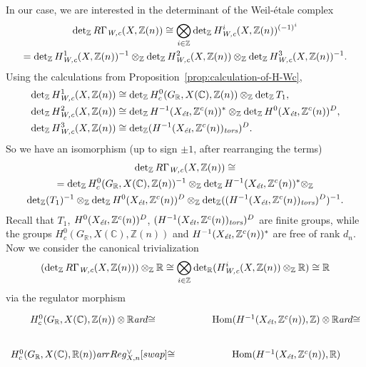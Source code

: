 \documentclass{article}
\DeclareMathOperator{\Hom}{Hom}
\newcommand{\CC}{\mathbb{C}}
\newcommand{\RR}{\mathbb{R}}
\newcommand{\ZZ}{\mathbb{Z}}
\renewcommand{\det}{\operatorname{det}}
\newcommand{\ar}{\text{\it ar}}
\newcommand{\et}{\text{\it \'{e}t}}
\newcommand{\tors}{\text{\it tors}}
\newcommand{\Wc}{\text{\it W,c}}
\theoremstyle{myplain}
\theoremstyle{mydefinition}
\begin{document}
In our case, we are interested in the determinant of the Weil-\'{e}tale complex
\begin{multline*}
  \det_\ZZ R\Gamma_\Wc (X, \ZZ(n)) \cong
  \bigotimes_{i \in \ZZ} \det_\ZZ H^i_\Wc (X, \ZZ(n))^{(-1)^i} \\
  =
  \det_\ZZ H^1_\Wc (X, \ZZ(n))^{-1} \otimes_\ZZ
  \det_\ZZ H^2_\Wc (X, \ZZ(n)) \otimes_\ZZ
  \det_\ZZ H^3_\Wc (X, \ZZ(n))^{-1}.
\end{multline*}
Using the calculations from Proposition~\ref{prop:calculation-of-H-Wc},
\begin{align*}
  \det_\ZZ H^1_\Wc (X, \ZZ(n)) & \cong \det_\ZZ H^0_c (G_\RR, X(\CC), \ZZ(n)) \otimes_\ZZ \det_\ZZ T_1, \\
  \det_\ZZ H^2_\Wc (X, \ZZ(n)) & \cong \det_\ZZ H^{-1} (X_\et, \ZZ^c(n))^* \otimes_\ZZ \det_\ZZ H^0 (X_\et, \ZZ^c(n))^D, \\
  \det_\ZZ H^3_\Wc (X, \ZZ(n)) & \cong \det_\ZZ (H^{-1} (X_\et, \ZZ^c(n))_\tors)^D.
\end{align*}
So we have an isomorphism (up to sign $\pm 1$, after rearranging the terms)
\begin{multline*}
  \det_\ZZ R\Gamma_\Wc (X, \ZZ(n)) \cong \\
  =
  \det_\ZZ H^0_c (G_\RR, X(\CC), \ZZ(n))^{-1} \otimes_\ZZ
  \det_\ZZ H^{-1} (X_\et, \ZZ^c(n))^* \otimes_\ZZ \\
  \det_\ZZ (T_1)^{-1} \otimes_\ZZ  \det_\ZZ H^0 (X_\et, \ZZ^c(n))^D \otimes_\ZZ \det_\ZZ ((H^{-1} (X_\et, \ZZ^c(n))_\tors)^D)^{-1}.
\end{multline*}
Recall that $T_1$, $H^0 (X_\et, \ZZ^c(n))^D$,
$(H^{-1} (X_\et, \ZZ^c(n))_\tors)^D$ are finite groups, while the groups
$H^0_c (G_\RR, X(\CC), \ZZ(n))$ and $H^{-1} (X_\et, \ZZ^c(n))^*$ are free of
rank $d_n$. Now we consider the canonical trivialization
\[ (\det_\ZZ R\Gamma_\Wc (X, \ZZ(n))) \otimes_\ZZ \RR \cong
  \bigotimes_{i\in \ZZ} \det_\RR (H^i_\Wc (X, \ZZ(n))\otimes_\ZZ \RR)
  \cong \RR \]
via the regulator morphism
\[ \begin{tikzcd}[column sep=3em]
    H^0_c (G_\RR, X(\CC), \ZZ(n)) \otimes \RR\ar{d}{\cong} & \Hom (H^{-1} (X_\et, \ZZ^c (n)), \ZZ) \otimes \RR\ar{d}{\cong} \\
    H^0_c (G_\RR, X(\CC), \RR (n)) \ar{r}{Reg^\vee_{X,n}}[swap]{\cong} & \Hom (H^{-1} (X_\et, \ZZ^c (n)), \RR)
  \end{tikzcd} \]
\end{document}
